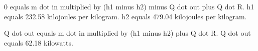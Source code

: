 0 equals m dot in multiplied by (h1 minus h2) minus Q dot out plus Q dot R.  
h1 equals 232.58 kilojoules per kilogram.  
h2 equals 479.04 kilojoules per kilogram.  

Q dot out equals m dot in multiplied by (h1 minus h2) plus Q dot R.  
Q dot out equals 62.18 kilowatts.